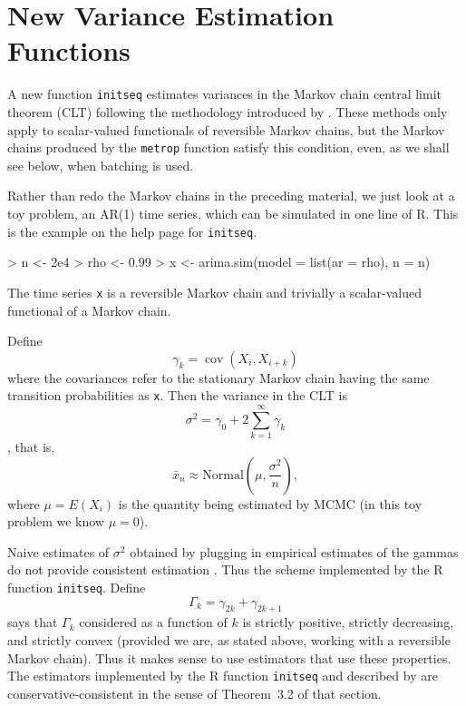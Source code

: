 \documentclass{article}
\DeclareMathOperator{\cov}{cov}
\begin{document}
\section{New Variance Estimation Functions}

A new function \texttt{initseq} estimates variances in the Markov chain
central limit theorem (CLT) following the methodology introduced by
\citet[Section~3.3]{practical}.  These methods only apply to scalar-valued
functionals of
reversible Markov chains, but the Markov chains produced by the \texttt{metrop}
function satisfy this condition, even, as we shall see below, when batching
is used.

Rather than redo the Markov chains in the preceding material, we just look
at a toy problem, an AR(1) time series, which can be simulated in one line
of R.  This is the example on the help page for \texttt{initseq}.
\begin{Schunk}
\begin{Sinput}
> n <- 2e4
> rho <- 0.99
> x <- arima.sim(model = list(ar = rho), n = n)
\end{Sinput}
\end{Schunk}
The time series \texttt{x} is a reversible Markov chain and trivially
a scalar-valued functional of a Markov chain.

Define
\begin{equation} \label{eq:little}
   \gamma_k = \cov(X_i, X_{i + k})
\end{equation}
where the covariances refer to the stationary Markov chain having the
same transition probabilities as \texttt{x}.  Then the variance in the CLT
is
$$
   \sigma^2 = \gamma_0 + 2 \sum_{k = 1}^\infty \gamma_k
$$
\citep[Theorem~2.1]{practical}, that is,
$$
   \bar{x}_n \approx \text{Normal}\left(\mu, \frac{\sigma^2}{n}\right),
$$
where $\mu = E(X_i)$ is the quantity being estimated by MCMC (in this
toy problem we know $\mu = 0$).

Naive estimates of $\sigma^2$ obtained by plugging in empirical
estimates of the gammas do not provide consistent estimation
\citep[Section~3.1]{practical}.  Thus the scheme implemented
by the R function \texttt{initseq}.  Define
\begin{equation} \label{eq:big}
   \Gamma_k = \gamma_{2 k} + \gamma_{2 k + 1}
\end{equation}
\citet[Theorem~3.1]{practical} says that $\Gamma_k$ considered as a function
of $k$ is strictly positive, strictly decreasing, and strictly convex
(provided we are, as stated above, working with a reversible Markov chain).
Thus it makes sense to use estimators that use these properties.
The estimators implemented by the R function \texttt{initseq} and
described by \citet[Section~3.3]{practical} are conservative-consistent
in the sense of Theorem~3.2 of that section.
\end{document}
